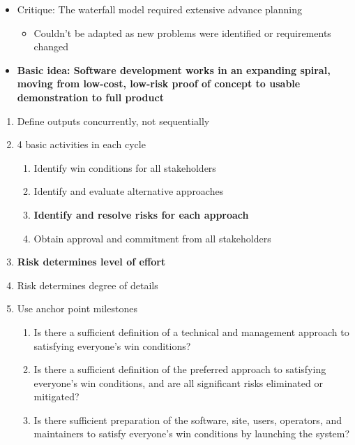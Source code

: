 \documentclass[
]{article}
\providecommand{\tightlist}{%
  \setlength{\itemsep}{0pt}\setlength{\parskip}{0pt}}
\begin{document}
\begin{itemize}
\tightlist
\item
  Critique: The waterfall model required extensive advance planning

  \begin{itemize}
  \tightlist
  \item
    Couldn't be adapted as new problems were identified or requirements changed
  \end{itemize}
\item
  \textbf{Basic idea: Software development works in an expanding spiral, moving from low-cost, low-risk proof of concept to usable demonstration to full product}
\end{itemize}

\begin{enumerate}
\def\labelenumi{\arabic{enumi}.}
\tightlist
\item
  Define outputs concurrently, not sequentially
\item
  4 basic activities in each cycle

  \begin{enumerate}
  \def\labelenumii{\alph{enumii}.}
  \tightlist
  \item
    Identify win conditions for all stakeholders
  \item
    Identify and evaluate alternative approaches
  \item
    \textbf{Identify and resolve risks for each approach}
  \item
    Obtain approval and commitment from all stakeholders
  \end{enumerate}
\item
  \textbf{Risk determines level of effort}
\item
  Risk determines degree of details
\item
  Use anchor point milestones

  \begin{enumerate}
  \def\labelenumii{\alph{enumii}.}
  \tightlist
  \item
    Is there a sufficient definition of a technical and management approach to satisfying everyone's win conditions?
  \item
    Is there a sufficient definition of the preferred approach to satisfying everyone's win conditions, and are all significant risks eliminated or mitigated?
  \item
    Is there sufficient preparation of the software, site, users, operators, and maintainers to satisfy everyone's win conditions by launching the system?
  \end{enumerate}
\end{enumerate}
\end{document}
